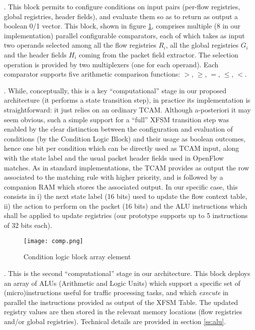 \documentclass{sig-alternate}
\begin{document}
\vspace{3pt} . This block permits to configure conditions on input pairs (per-flow registries, global registries, header fields), and evaluate them so as to return as output a boolean 0/1 vector. This block, shown in figure \ref{F:cond}, comprises multiple (8 in our implementation) parallel configurable comparators, each of which takes as input two operands selected among all the flow registries $R_i$, all the global registries $G_i$ and the header fields $H_i$ coming from the packet field extractor. The selection operation is provided by two multiplexers (one for each operand). Each comparator supports five arithmetic comparison functions: $>$, $\ge$, $=$, $\le$, $<$.

\vspace{3pt} . While, conceptually, this is a key ``computational'' stage in our proposed architecture (it performs a state transition step), in practice its implementation is straightforward: it just relies on an ordinary TCAM. Although a-posteriori it may seem obvious, such a simple support for a ``full'' XFSM transition step was enabled by the clear distinction between the configuration and evaluation of conditions (by the Condition Logic Block) and their usage as boolean outcomes, hence one bit per condition which can be directly used as TCAM input, along with the state label and the usual packet header fields used in OpenFlow matches. As in standard implementations, the TCAM provides as output the row associated to the matching rule with higher priority, and is followed by a companion RAM which stores the associated output. In our specific case, this consists in i) the next state label (16 bits) used to update the flow context table, ii) the action to perform on the packet (16 bits) and the ALU  instructions which shall be applied to update registries (our prototype supports up to 5 instructions of 32 bits each).

\begin{figure}[t]
\centering
   \texttt{[image: comp.png]}
      	  \vspace{-2em}
\caption{Condition logic block array element}
   	  \vspace{-1.8em}
\label{F:cond}
\end{figure}

\vspace{3pt} . This is the second ``computational'' stage in our architecture. This block deploys an array of ALUs (Arithmetic and Logic Units) which support a specific set of (micro)instructions useful for traffic processing tasks, and which {\em execute} in parallel the instructions provided as output of the XFSM Table. The updated registry values are then stored in the relevant memory locations (flow registries and/or global registries). Technical details are provided in section \ref{ss:alu}.
\end{document}
